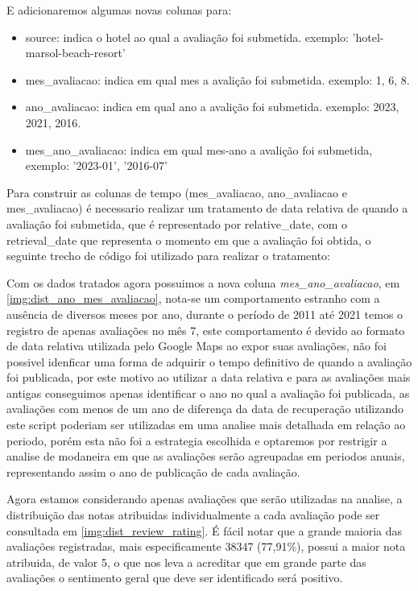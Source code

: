 E adicionaremos algumas novas colunas para:

\begin{itemize}
	\item source: indica o hotel ao qual a avaliação foi submetida. exemplo: 'hotel-marsol-beach-resort'
	\item mes\_avaliacao: indica em qual mes a avalição foi submetida. exemplo: 1, 6, 8.
	\item ano\_avaliacao: indica em qual ano a avalição foi submetida. exemplo: 2023, 2021, 2016.
	\item mes\_ano\_avaliacao: indica em qual mes-ano a avalição foi submetida, exemplo: '2023-01', '2016-07'
\end{itemize}


Para construir as colunas de tempo (mes\_avaliacao, ano\_avaliacao e mes\ano\_avaliacao) é necessario realizar um tratamento de data relativa de quando a avaliação foi submetida, que é representado por relative\_date, com o retrieval\_date que representa o momento em que a avaliação foi obtida, o seguinte trecho de código foi utilizado para realizar o tratamento:


Com os dados tratados agora possuimos a nova coluna \emph{mes\_ano\_avaliacao}, em \ref{img:dist_ano_mes_avaliacao}, nota-se um comportamento estranho com a ausência de diversos meses por ano, durante o período de 2011 até 2021 temos o registro de apenas avaliações no mês 7, este comportamento é devido ao formato de data relativa utilizada pelo Google Maps ao expor suas avaliações, não foi possivel idenficar uma forma de adquirir o tempo definitivo de quando a avaliação foi publicada, por este motivo ao utilizar a data relativa e para as avaliações mais antigas conseguimos apenas identificar o ano no qual a avaliação foi publicada, as avaliações com menos de um ano de diferença da data de recuperação utilizando este script poderiam ser utilizadas em uma analise mais detalhada em relação ao periodo, porém esta não foi a estrategia escolhida e optaremos por restrigir a analise de modaneira em que as avaliações serão agreupadas em periodos anuais, representando assim o ano de publicação de cada avaliação.

Agora estamos considerando apenas avaliações que serão utilizadas na analise, a distribuição das notas atribuidas individualmente a cada avaliação pode ser consultada em \ref{img:dist_review_rating}. É fácil notar que a grande maioria das avaliações registradas, mais especificamente 38347 (77,91\%), possui a maior nota atribuida, de valor 5, o que nos leva a acreditar que em grande parte das avaliações o sentimento geral que deve ser identificado será positivo.

